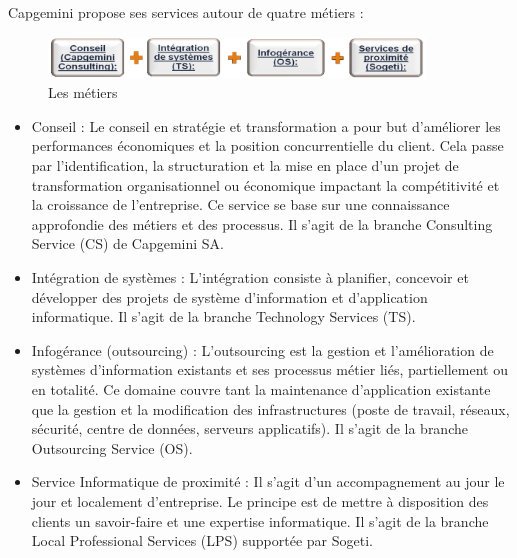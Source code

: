 Capgemini propose ses services autour de quatre métiers :

\begin{figure}[!h]
    \centering
        \includegraphics[width=10cm]{img/metiers.png}
        \caption{Les métiers}
        \label{fig:metiers}
\end{figure}

\begin{itemize}
    \item Conseil : Le conseil en stratégie et transformation a pour but d'améliorer les performances économiques et la position concurrentielle du client. Cela passe par l'identification, la structuration et la mise en place d'un projet de transformation organisationnel ou économique impactant la compétitivité et la croissance de l'entreprise. Ce service se base sur une connaissance approfondie des métiers et des processus. Il s'agit de la branche Consulting Service (CS) de Capgemini SA.
    \item Intégration de systèmes : L'intégration consiste à planifier, concevoir et développer des projets de système d'information et d'application informatique. Il s'agit de la branche Technology Services (TS).
    \item Infogérance (outsourcing) : L'outsourcing est la gestion et l'amélioration de systèmes d'information existants et ses processus métier liés, partiellement ou en totalité. Ce domaine couvre tant la maintenance d'application existante que la gestion et la modification des infrastructures (poste de travail, réseaux, sécurité, centre de données, serveurs applicatifs). Il s'agit de la branche Outsourcing Service (OS).
    \item Service Informatique de proximité : Il s'agit d'un accompagnement au jour le jour et localement d'entreprise. Le principe est de mettre à disposition des clients un savoir-faire et une expertise informatique. Il s'agit de la branche Local Professional Services (LPS) supportée par Sogeti.
\end{itemize}
